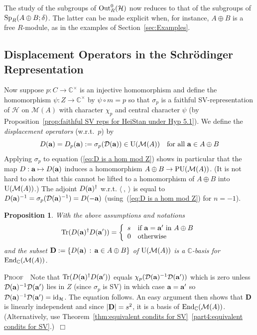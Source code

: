 \documentclass[12pt]{article}
\newtheorem{prop}{Proposition}[section]
\newcounter{example}[section]
\newcommand{\addwords}[1]{\ \ \ \mbox{#1}}
\newcommand{\ba}{\ensuremath{{\bf a}}}
\newcommand{\bbC}{\ensuremath{\mathbb{C}}}\newcommand{\bbCp}{\ensuremath{\mathbb{C}_p}}
\newcommand{\bD}{\ensuremath{{\bf D}}}
\newcommand{\bPf}{\noindent \textsc{Proof\ }}
\newcommand{\cD}{\ensuremath{\mathcal{D}}}
\newcommand{\cH}{\ensuremath{\mathcal{H}}}
\newcommand{\cM}{\mathcal{M}}
\newcommand{\cR}{\ensuremath{\mathcal{R}}}
\newcommand{\eitherortw}[4] %
{\left\{                  %
	\begin{array}{ll}         %
		#1& \mbox{#2}\\
		#3& \mbox{#4}
	\end{array}
	\right.}
\newcommand{\End}{{\rm End}}
\newcommand{\ePf}{~$\Box$\vertsp\par}%
\newcommand{\id}{{\rm id}}
\newcommand{\inv}{^{-1}}%
\newcommand{\Out}{{\rm Out}}
\newcommand{\Tr}{{\rm Tr}}
\newcommand{\vertsp}{\vspace{1ex}}
\newcommand{\AdsB}{\ensuremath{A\oplus B}}
\newcommand{\SpABd}[1]{\ensuremath{{\rm Sp}_{#1}(\AdsB;\delta)}}
\begin{document}
\noindent The study of the subgroups of  $\Out^0_R(\cH)$ now  reduces to that of the subgroups of $\SpABd{R}$. The latter can be made explicit when, for instance, $\AdsB$ is a free $R$-module, as in the examples of Section~\ref{sec:Examples}.
\subsection{Displacement Operators in the Schr\"odinger Representation}\label{subsec:Projectors}
Now suppose $p:C\rightarrow\bbC^\times$ is an injective homomorphism and define the homomorphism $\psi:Z\rightarrow\bbC^\times$ by $\psi\circ m = p$ so that $\sigma_p$ is a faithful SV-representation of $\cH$ on $\cM(A)$ with character $\chi_p$ and central character $\psi$ (by Proposition~\ref{prop:faithful SV reps for HeiStan under Hyp 5.1}).
We define the {\em displacement operators} (w.r.t.\ $p$) by  
$$
D(\ba)=D_p(\ba):=\sigma_p(\cD(\ba))\in{\rm U}(\cM(A))\addwords{for all $\ba\in A\oplus B$}
$$
Applying $\sigma_p$ to equation (\ref{eq:D is a hom mod Z}) shows in particular that the map $D:\ba\mapsto D(\ba)$ induces a homomorphism $A\oplus B\rightarrow {\rm PU}(\cM(A))$. (It is not hard to show that this cannot be lifted to a homomorphism of $A\oplus B$ into ${\rm U}(\cM(A))$.)
The adjoint $D(\ba)^\dagger$ w.r.t. $\langle\ ,\ \rangle$ is equal to $D(\ba)\inv=\sigma_p(\cD(\ba)\inv)=D(-\ba)$ (using~(\ref{eq:D is a hom mod Z}) for $n=-1$).
\begin{prop} With the above assumptions and notations  
	$$\Tr(D(\ba)^\dagger D(\ba'))=\eitherortw{s}{\mbox{if $\ba=\ba'$ in $A\oplus B$}}{0}{otherwise} $$
	and the subset ${\bD}:=\{D(\ba)\,:\,\ba\in A\oplus B\}$ of $   {\rm U}(\cM(A))$ is a $\bbC$-basis for $\End_\bbC(\cM(A))$.
\end{prop}
\bPf\ Note that $\Tr(D(\ba)^\dagger D(\ba'))$ equals $\chi_p(\cD(\ba)\inv\cD(\ba'))$ which is zero unless $\cD(\ba)\inv\cD(\ba')$ lies in $Z$ (since $\sigma_p$ is SV) in which case $\ba=\ba'$ so $\cD(\ba)\inv\cD(\ba')=\id_\cH$. The equation follows. An easy argument then shows that $\bD$ is linearly independent and since $|\bD|=s^2$, it is a basis of $\End_\bbC(\cM(A))$. (Alternatively, use Theorem~\ref{thm:equivalent condits for SV}~\ref{part4:equivalent condits for SV}.)\ePf 
\end{document}
